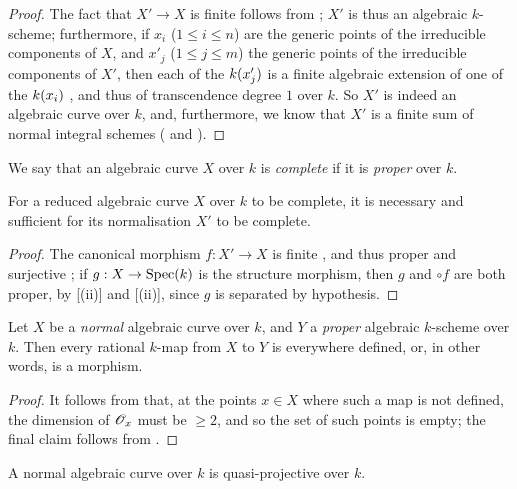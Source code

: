 \begin{proof}
The fact that $X'\to X$ is finite follows from ;
$X'$ is thus an algebraic $k$-scheme;
furthermore, if $x_i$ ($1\leq i\leq n$) are the generic points of the irreducible components of $X$, and $x'_j$ ($1\leq j\leq m$) the generic points of the irreducible components of $X'$, then each of the $k(x'_j)$ is a finite algebraic extension of one of the $k(x_i)$ , and thus of transcendence degree $1$ over $k$.
So $X'$ is indeed an algebraic curve over $k$, and, furthermore, we know that $X'$ is a finite sum of normal integral schemes ( and ).
\end{proof}

\begin{env}[7.4.7]
\label{II.7.4.7}
We say that an algebraic curve $X$ over $k$ is \emph{complete} if it is \emph{proper} over $k$.
\end{env}

\begin{corollary}[7.4.8]
\label{II.7.4.8}
For a reduced algebraic curve $X$ over $k$ to be complete, it is necessary and sufficient for its normalisation $X'$ to be complete.
\end{corollary}

\begin{proof}
The canonical morphism $f:X'\to X$ is finite , and thus proper  and surjective ;
if $g:X\to\Spec(k)$ is the structure morphism, then $g$ and $\circ f$ are both proper, by [(ii)] and [(ii)], since $g$ is separated by hypothesis.
\end{proof}

\begin{proposition}[7.4.9]
\label{II.7.4.9}
Let $X$ be a \emph{normal} algebraic curve over $k$, and $Y$ a \emph{proper} algebraic $k$-scheme over $k$.
Then every rational $k$-map from $X$ to $Y$ is everywhere defined, or, in other words, is a morphism.
\end{proposition}

\begin{proof}
It follows from  that, at the points $x\in X$ where such a map is not defined, the dimension of $\mathscr{O}_x$ must be $\geq2$, and so the set of such points is empty;
the final claim follows from .
\end{proof}

\begin{corollary}[7.4.10]
\label{II.7.4.10}
A normal algebraic curve over $k$ is quasi-projective over $k$.
\end{corollary}


